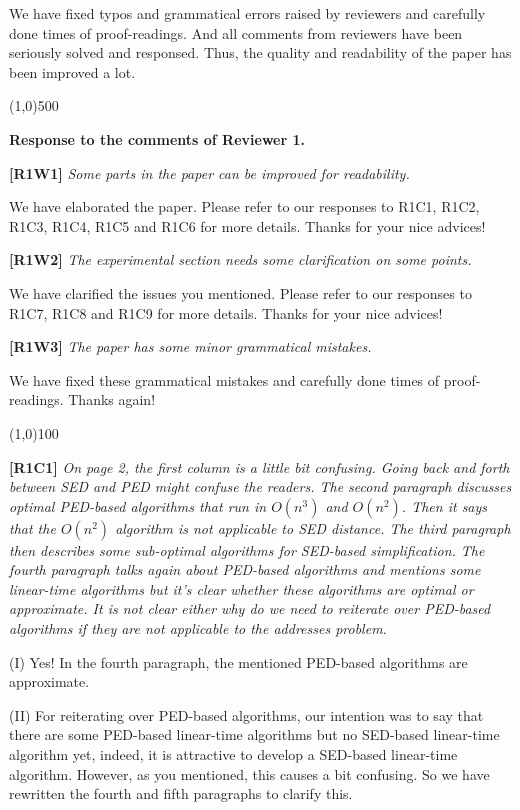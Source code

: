 \documentclass{letter}
\begin{document}
We have fixed typos and grammatical errors raised by reviewers and carefully done times of proof-readings. And all comments from reviewers have been seriously solved and responsed. Thus, the quality and readability of the paper has been improved a lot.

\line(1,0){500}

\textbf{Response to the comments of Reviewer 1.}

\textbf{[R1W1]} \emph{Some parts in the paper can be improved for readability.}

We have elaborated the paper. Please refer to our responses to R1C1, R1C2, R1C3, R1C4, R1C5 and R1C6 for more details. Thanks for your nice advices!

\textbf{[R1W2]} \emph{The experimental section needs some clarification on some points.}

We have clarified the issues you mentioned. Please refer to our responses to R1C7, R1C8 and R1C9 for more details. Thanks for your nice advices!

\textbf{[R1W3]} \emph{The paper has some minor grammatical mistakes.}

We have fixed these grammatical mistakes and carefully done times of proof-readings. Thanks again!

\line(1,0){100}

\textbf{[R1C1]} \emph{On page 2, the first column is a little bit confusing. Going back and forth between SED and PED might confuse the readers. The second paragraph discusses optimal PED-based algorithms that run in $O(n^3)$ and $O(n^2)$. Then it says that the $O(n^2)$ algorithm is not applicable to SED distance. The third paragraph then describes some sub-optimal algorithms for SED-based simplification. {The fourth paragraph talks again about PED-based algorithms and mentions some linear-time algorithms but it's clear whether these algorithms are optimal or approximate. It is not clear either why do we need to reiterate over PED-based algorithms if they are not applicable to the addresses problem.}}
 
(I) Yes! In the fourth paragraph, the mentioned PED-based algorithms are approximate. 

(II) For reiterating over PED-based algorithms, our intention was to say that there are some PED-based linear-time algorithms but no SED-based linear-time algorithm yet, indeed, it is attractive to develop a SED-based linear-time algorithm. However, as you mentioned, this causes a bit confusing. So we have rewritten the fourth and fifth paragraphs to clarify this.
\end{document}
